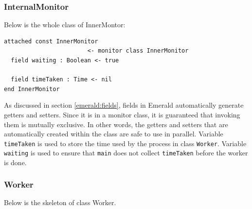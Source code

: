\subsubsection{InternalMonitor}
Below is the whole class of InnerMontor:
\begin{lstlisting}[language=emerald]
attached const InnerMonitor 
                        <- monitor class InnerMonitor
  field waiting : Boolean <- true

  field timeTaken : Time <- nil
end InnerMonitor
\end{lstlisting}
As discussed in section \ref{emerald:fields}, fields in Emerald automatically generate getters and setters. Since it is in a monitor class, it is guaranteed that invoking them is mutually exclusive. In other words, the getters and setters that are automatically created within the class are safe to use in parallel. Variable \verb|timeTaken| is used to store the time used by the process in class \verb|Worker|. Variable \verb|waiting| is used to ensure that \verb|main| does not collect \verb|timeTaken| before the worker is done. 





\subsubsection{Worker}
Below is the skeleton of class Worker.

